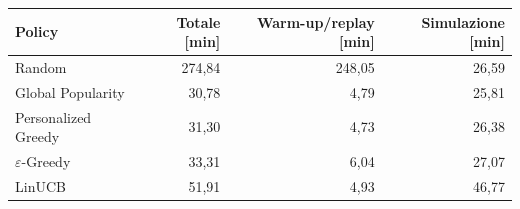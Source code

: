 \begin{tabular}{lrrr}
\toprule
Policy & Totale [min] & Warm-up/replay [min] & Simulazione [min] \\
\midrule
Random & 274,84 & 248,05 & 26,59 \\
Global Popularity & 30,78 & 4,79 & 25,81 \\
Personalized Greedy & 31,30 & 4,73 & 26,38 \\
$\varepsilon$-Greedy & 33,31 & 6,04 & 27,07 \\
LinUCB & 51,91 & 4,93 & 46,77 \\
\bottomrule
\end{tabular}

